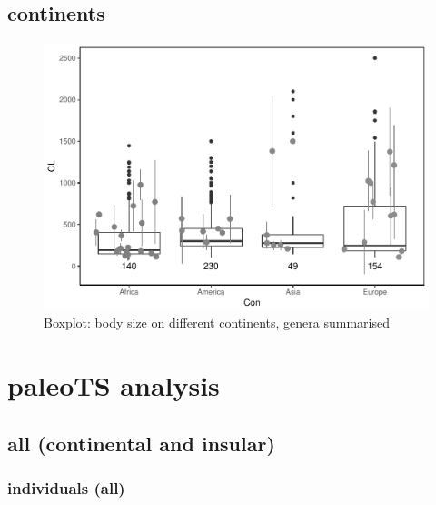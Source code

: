 \documentclass[]{article}
\begin{document}
\subsection{continents}\label{continents-1}

\begin{figure}[htbp]
\centering
\includegraphics{MA_JJ_files/figure-latex/Boxplot body size split into continents-1.pdf}
\caption{Boxplot: body size on different continents, genera summarised}
\end{figure}

\newpage

\section{paleoTS analysis}\label{paleots-analysis}

\subsection{all (continental and
insular)}\label{all-continental-and-insular}

\subsubsection{individuals (all)}\label{individuals-all}
\end{document}

